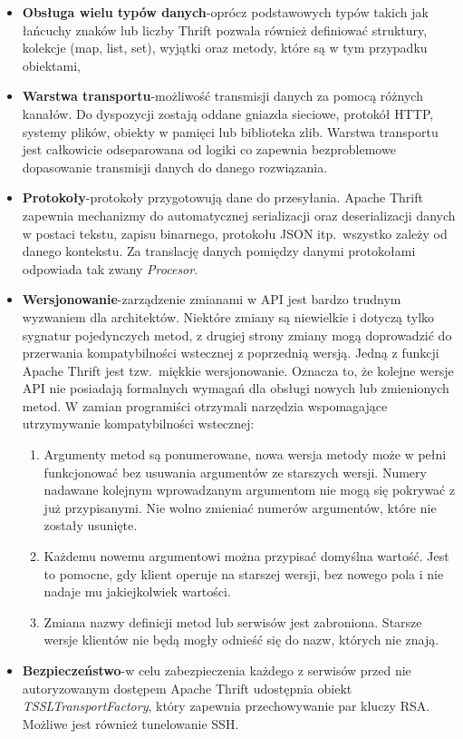 \begin{itemize}
  \item \textbf{Obsługa wielu typów danych}-oprócz podstawowych typów takich jak łańcuchy znaków lub liczby Thrift pozwala również definiować struktury, kolekcje (map, list, set), wyjątki oraz metody, które są w tym przypadku obiektami,
  \item \textbf{Warstwa transportu}-możliwość transmisji danych za pomocą różnych kanałów. Do dyspozycji zostają oddane gniazda sieciowe, protokół HTTP, systemy plików, obiekty w pamięci lub biblioteka zlib. Warstwa transportu jest całkowicie odseparowana od logiki co zapewnia bezproblemowe dopasowanie transmisji danych do danego rozwiązania.
  \item \textbf{Protokoły}-protokoły przygotowują dane do przesyłania. Apache Thrift zapewnia mechanizmy do automatycznej serializacji oraz deserializacji danych w postaci tekstu, zapisu binarnego, protokołu JSON itp.\ wszystko zależy od danego kontekstu. Za translację danych pomiędzy danymi protokołami odpowiada tak zwany \textit{Procesor}.
  \item \textbf{Wersjonowanie}-zarządzenie zmianami w API jest bardzo trudnym wyzwaniem dla architektów. Niektóre zmiany są niewielkie i dotyczą tylko sygnatur pojedynczych metod, z drugiej strony zmiany mogą doprowadzić do przerwania kompatybilności wstecznej z poprzednią wersją. Jedną z funkcji Apache Thrift jest tzw.\ miękkie wersjonowanie. Oznacza to, że kolejne wersje API nie posiadają formalnych wymagań dla obsługi nowych lub zmienionych metod. W zamian programiści otrzymali narzędzia wspomagające utrzymywanie kompatybilności wstecznej:
        \begin{enumerate}
          \item Argumenty metod są ponumerowane, nowa wersja metody może w pełni funkcjonować bez usuwania argumentów ze starszych wersji. Numery nadawane kolejnym wprowadzanym argumentom nie mogą się pokrywać z już przypisanymi. Nie wolno zmieniać numerów argumentów, które nie zostały usunięte.
          \item Każdemu nowemu argumentowi można przypisać domyślna wartość. Jest to pomocne, gdy klient operuje na starszej wersji, bez nowego pola i nie nadaje mu jakiejkolwiek wartości.
          \item Zmiana nazwy definicji metod lub serwisów jest zabroniona. Starsze wersje klientów nie będą mogły odnieść się do nazw, których nie znają.
        \end{enumerate}
  \item \textbf{Bezpieczeństwo}-w celu zabezpieczenia każdego z serwisów przed nie autoryzowanym dostępem Apache Thrift udostępnia obiekt \textit{TSSLTransportFactory}, który zapewnia przechowywanie par kluczy RSA\@. Możliwe jest również tunelowanie SSH.\@

\end{itemize}
